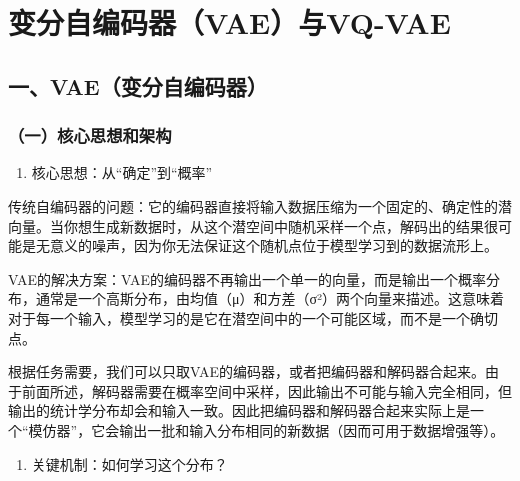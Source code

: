 \setcounter{section}{2}

\hypertarget{ux53d8ux5206ux81eaux7f16ux7801ux5668vaeux4e0evq-vae}{%
\section{变分自编码器（VAE）与VQ-VAE}\label{ux53d8ux5206ux81eaux7f16ux7801ux5668vaeux4e0evq-vae}}

\hypertarget{ux4e00vaeux53d8ux5206ux81eaux7f16ux7801ux5668}{%
\subsection{一、VAE（变分自编码器）}\label{ux4e00vaeux53d8ux5206ux81eaux7f16ux7801ux5668}}

\hypertarget{ux4e00ux6838ux5fc3ux601dux60f3ux548cux67b6ux6784}{%
\subsubsection{（一）核心思想和架构}\label{ux4e00ux6838ux5fc3ux601dux60f3ux548cux67b6ux6784}}

\begin{enumerate}
\def\labelenumi{\arabic{enumi}.}
\tightlist
\item
  核心思想：从``确定''到``概率''
\end{enumerate}

传统自编码器的问题：它的编码器直接将输入数据压缩为一个固定的、确定性的潜向量。当你想生成新数据时，从这个潜空间中随机采样一个点，解码出的结果很可能是无意义的噪声，因为你无法保证这个随机点位于模型学习到的数据流形上。

VAE的解决方案：VAE的编码器不再输出一个单一的向量，而是输出一个概率分布，通常是一个高斯分布，由均值（μ）和方差（σ²）两个向量来描述。这意味着对于每一个输入，模型学习的是它在潜空间中的一个可能区域，而不是一个确切点。

根据任务需要，我们可以只取VAE的编码器，或者把编码器和解码器合起来。由于前面所述，解码器需要在概率空间中采样，因此输出不可能与输入完全相同，但输出的统计学分布却会和输入一致。因此把编码器和解码器合起来实际上是一个``模仿器''，它会输出一批和输入分布相同的新数据（因而可用于数据增强等）。

\begin{enumerate}
\def\labelenumi{\arabic{enumi}.}
\setcounter{enumi}{1}
\tightlist
\item
  关键机制：如何学习这个分布？
\end{enumerate}

